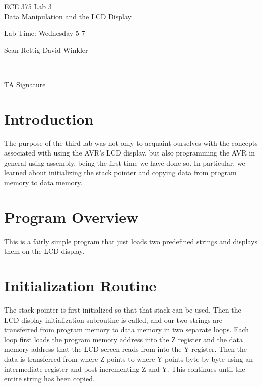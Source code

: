 \documentclass[12pt,letterpaper]{article}
\begin{document}
\begin{titlepage}
    \vspace*{4cm}
    \begin{flushright}
    {\huge
        ECE 375 Lab 3\\[1cm]
    }
    {\large
        Data Manipulation and the LCD Display
    }
    \end{flushright}
    \begin{flushleft}
    Lab Time: Wednesday 5-7
    \end{flushleft}
    \begin{flushright}
    Sean Rettig
    David Winkler
    \vfill
    \rule{5in}{.5mm}\\
    TA Signature
    \end{flushright}

\end{titlepage}

\section{Introduction}

The purpose of the third lab was not only to acquaint ourselves with the concepts associated with using the AVR's LCD display, but also programming the AVR in general using assembly, being the first time we have done so.  In particular, we learned about initializing the stack pointer and copying data from program memory to data memory.

\section{Program Overview}

This is a fairly simple program that just loads two predefined strings and displays them on the LCD display.

\section{Initialization Routine}

The stack pointer is first initialized so that that stack can be used.  Then the LCD display initialization subroutine is called, and our two strings are transferred from program memory to data memory in two separate loops.  Each loop first loads the program memory address into the Z register and the data memory address that the LCD screen reads from into the Y register.  Then the data is transferred from where Z points to where Y points byte-by-byte using an intermediate register and post-incrementing Z and Y.  This continues until the entire string has been copied.
\end{document}
